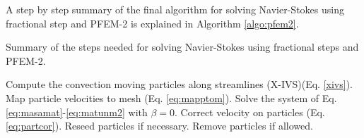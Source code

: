 A step by step summary of the final algorithm for solving Navier-Stokes using fractional step and PFEM-2 is explained in Algorithm \ref{algo:pfem2}.
%
\begin{algorithm}[H]
\caption{Summary of the steps needed for solving Navier-Stokes using fractional steps and PFEM-2.}
\label{algo:pfem2}
\begin{algorithmic}[1]
\STATE Compute the convection moving particles along streamlines (X-IVS)(Eq. \ref{xivs}).
\STATE Map particle velocities to mesh (Eq. \ref{eq:mapptom}).
\STATE Solve the system of Eq. \ref{eq:masamat}-\ref{eq:matunm2} with $\beta=0$.
\STATE Correct velocity on particles (Eq. \ref{eq:partcor}).
\STATE Reseed particles if necessary.
\STATE Remove particles if allowed.
\end{algorithmic}
\end{algorithm} 
%
